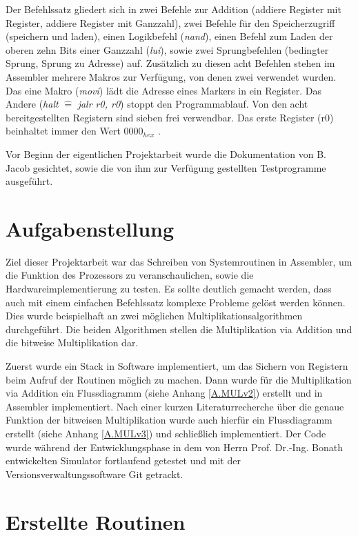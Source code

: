 \documentclass[fleqn, a4paper, 11pt]{article}       %
\begin{document}
Der Befehlssatz gliedert sich in zwei Befehle zur Addition (addiere Register mit Register, addiere Register mit Ganzzahl), zwei Befehle für den Speicherzugriff (speichern und laden), einen Logikbefehl (\emph{nand}), einen Befehl zum Laden der oberen zehn Bits einer Ganzzahl (\emph{lui}), sowie zwei Sprungbefehlen (bedingter Sprung, Sprung zu Adresse) auf. Zusätzlich zu diesen acht Befehlen stehen im Assembler mehrere Makros zur Verfügung, von denen zwei verwendet wurden. Das eine Makro (\emph{movi}) lädt die Adresse eines Markers in ein Register. Das Andere (\emph{halt} $\widehat{=}$ \emph{jalr r0, r0}) stoppt den Programmablauf. Von den acht bereitgestellten Registern sind sieben frei verwendbar. Das erste Register (r0) beinhaltet immer den Wert $0000_{hex}$ \cite[1]{JACOBInstr}.

Vor Beginn der eigentlichen Projektarbeit wurde die Dokumentation von B. Jacob gesichtet, sowie die von ihm zur Verfügung gestellten Testprogramme ausgeführt.


\section{Aufgabenstellung}
Ziel dieser Projektarbeit war das Schreiben von Systemroutinen in Assembler, um die Funktion des Prozessors zu veranschaulichen, sowie die Hardwareimplementierung zu testen. Es sollte deutlich gemacht werden, dass auch mit einem einfachen Befehlssatz komplexe Probleme gelöst werden können. Dies wurde beispielhaft an zwei möglichen Multiplikationsalgorithmen durchgeführt. Die beiden Algorithmen stellen die Multiplikation via Addition und die bitweise Multiplikation dar. 

Zuerst wurde ein Stack in Software implementiert, um das Sichern von Registern beim Aufruf der Routinen möglich zu machen. Dann wurde für die Multiplikation via Addition ein Flussdiagramm (siehe Anhang \ref{A.MULv2}) erstellt und in Assembler implementiert. Nach einer kurzen Literaturrecherche über die genaue Funktion der bitweisen Multiplikation wurde auch hierfür ein Flussdiagramm erstellt (siehe Anhang \ref{A.MULv3}) und schließlich implementiert. Der Code wurde während der Entwicklungsphase in dem von Herrn Prof. Dr.-Ing. Bonath entwickelten Simulator fortlaufend getestet und mit der Versionsverwaltungssoftware Git getrackt.

\section{Erstellte Routinen}
\end{document}
